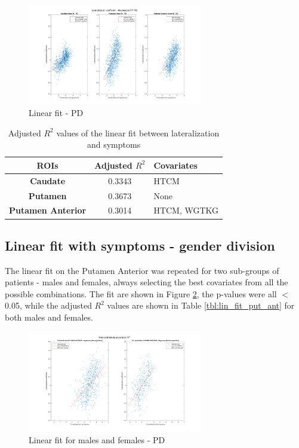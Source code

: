 \documentclass[]{article}
\begin{document}
\begin{figure}[h]
	\centering
	\includegraphics[width=3in]{../fit_covariates_pd}
	\caption{Linear fit - PD}
	\label{fig:lin_fit_pd}
\end{figure} 

\begin{table}[h]
	\centering
	\begin{tabular}{|c|c|l|}
		\hline
		\textbf{ROIs}             & \textbf{Adjusted $R^2$} & \textbf{Covariates} \\ \hline
		\textbf{Caudate}          & 0.3343                  & HTCM                \\ \hline
		\textbf{Putamen}          & 0.3673                  & None                \\ \hline
		\textbf{Putamen Anterior} & 0.3014                  & HTCM, WGTKG         \\ \hline
	\end{tabular}
	\caption{Adjusted $R^2$ values of the linear fit between lateralization and symptoms}
	\label{tbl:R_squared_fit_pd}
\end{table}


\begin{multicols}{2}

\subsection{Linear fit with symptoms - gender division}

The linear fit on the Putamen Anterior was repeated for two sub-groups of patients - males and females, always selecting the best covariates from all the possible combinations. The fit are shown in Figure \ref{fig:lin_fit_male_female}, the p-values were all $<$ 0.05, while the adjusted $R^2$ values are shown in Table \ref{tbl:lin_fit_put_ant} for both males and females.

\end{multicols}

\begin{figure}[h]
	\centering
	\includegraphics[width=3in]{../fit_covariates_male_female}
	\caption{Linear fit for males and females - PD}
	\label{fig:lin_fit_male_female}
\end{figure} 
\end{document}
